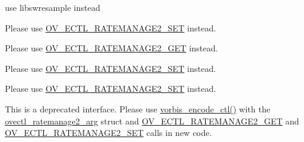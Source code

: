 \begin{DoxyRefList}
\item[\label{deprecated__deprecated000010}%
\hypertarget{deprecated__deprecated000010}{}%
\hyperlink{class_module}{Module} \hyperlink{group__lavc__resample}{lavc\+\_\+resample} ]use libswresample instead 
\item[\label{deprecated__deprecated000034}%
\hypertarget{deprecated__deprecated000034}{}%
Member \hyperlink{vorbisenc_8h_a34c3170d227b6368041e59c1dc7ed6e4}{O\+V\+\_\+\+E\+C\+T\+L\+\_\+\+R\+A\+T\+E\+M\+A\+N\+A\+G\+E\+\_\+\+A\+VG} ]Please use \hyperlink{vorbisenc_8h_a5075e0acb85fd45398a290594f83d6ba}{O\+V\+\_\+\+E\+C\+T\+L\+\_\+\+R\+A\+T\+E\+M\+A\+N\+A\+G\+E2\+\_\+\+S\+ET} instead. 
\item[\label{deprecated__deprecated000032}%
\hypertarget{deprecated__deprecated000032}{}%
Member \hyperlink{vorbisenc_8h_a614481c0d84bdfbb80eed9208b68f779}{O\+V\+\_\+\+E\+C\+T\+L\+\_\+\+R\+A\+T\+E\+M\+A\+N\+A\+G\+E\+\_\+\+G\+ET} ]Please use \hyperlink{vorbisenc_8h_af95048070bedb467f80ce85e20057126}{O\+V\+\_\+\+E\+C\+T\+L\+\_\+\+R\+A\+T\+E\+M\+A\+N\+A\+G\+E2\+\_\+\+G\+ET} instead. 
\item[\label{deprecated__deprecated000035}%
\hypertarget{deprecated__deprecated000035}{}%
Member \hyperlink{vorbisenc_8h_af8869980a805f431af57a50dffbf5d33}{O\+V\+\_\+\+E\+C\+T\+L\+\_\+\+R\+A\+T\+E\+M\+A\+N\+A\+G\+E\+\_\+\+H\+A\+RD} ]Please use \hyperlink{vorbisenc_8h_a5075e0acb85fd45398a290594f83d6ba}{O\+V\+\_\+\+E\+C\+T\+L\+\_\+\+R\+A\+T\+E\+M\+A\+N\+A\+G\+E2\+\_\+\+S\+ET} instead. 
\item[\label{deprecated__deprecated000033}%
\hypertarget{deprecated__deprecated000033}{}%
Member \hyperlink{vorbisenc_8h_a1daa1fd8ce1064cce01dde3ad447d389}{O\+V\+\_\+\+E\+C\+T\+L\+\_\+\+R\+A\+T\+E\+M\+A\+N\+A\+G\+E\+\_\+\+S\+ET} ]Please use \hyperlink{vorbisenc_8h_a5075e0acb85fd45398a290594f83d6ba}{O\+V\+\_\+\+E\+C\+T\+L\+\_\+\+R\+A\+T\+E\+M\+A\+N\+A\+G\+E2\+\_\+\+S\+ET} instead. 
\item[\label{deprecated__deprecated000031}%
\hypertarget{deprecated__deprecated000031}{}%
Class \hyperlink{structovectl__ratemanage__arg}{ovectl\+\_\+ratemanage\+\_\+arg} ]This is a deprecated interface. Please use \hyperlink{vorbisenc_8h_a5f398a378e20b8ce5e3341a582e773bd}{vorbis\+\_\+encode\+\_\+ctl()} with the \hyperlink{structovectl__ratemanage2__arg}{ovectl\+\_\+ratemanage2\+\_\+arg} struct and \hyperlink{vorbisenc_8h_af95048070bedb467f80ce85e20057126}{O\+V\+\_\+\+E\+C\+T\+L\+\_\+\+R\+A\+T\+E\+M\+A\+N\+A\+G\+E2\+\_\+\+G\+ET} and \hyperlink{vorbisenc_8h_a5075e0acb85fd45398a290594f83d6ba}{O\+V\+\_\+\+E\+C\+T\+L\+\_\+\+R\+A\+T\+E\+M\+A\+N\+A\+G\+E2\+\_\+\+S\+ET} calls in new code. 

\end{DoxyRefList}
